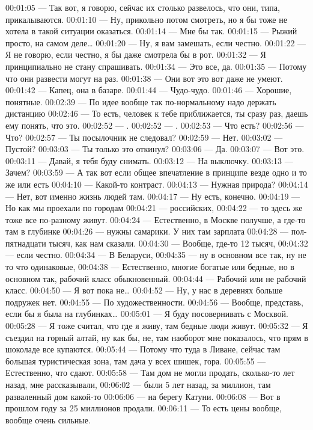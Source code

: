 00:01:05 — Так вот, я говорю, сейчас их столько развелось, что они, типа, прикалываются.
00:01:10 — Ну, прикольно потом смотреть, но я бы тоже не хотела в такой ситуации оказаться.
00:01:14 — Мне бы так.
00:01:15 — Рыжий просто, на самом деле…
00:01:20 — Ну, я вам замешать, если честно.
00:01:22 — Я не говорю, если честно, я бы даже смотрела бы в рот.
00:01:32 — Я принципиально не стану спрашивать.
00:01:34 — Это все, да.
00:01:35 — Потому что они развести могут на раз.
00:01:38 — Они вот это вот даже не умеют.
00:01:42 — Капец, она в базаре.
00:01:44 — Чудо-чудо.
00:01:46 — Хорошие, понятные.
00:02:39 — По идее вообще так по-нормальному надо держать дистанцию
00:02:46 — То есть, человек к тебе приближается, ты сразу раз, даешь ему понять, что это.
00:02:52 — .
00:02:52 — .
00:02:53 — Что есть?
00:02:56 — Что?
00:02:57 — Ты посылочник не следовал?
00:02:59 — Нет.
00:03:02 — Пустой?
00:03:03 — Ты только это откинул?
00:03:06 — Да.
00:03:07 — Вот это.
00:03:11 — Давай, я тебя буду снимать.
00:03:12 — На выключку.
00:03:13 — Зачем?
00:03:59 — А так вот если общее впечатление в принципе везде одно и то же или есть
00:04:10 — Какой-то контраст.
00:04:13 — Нужная природа?
00:04:14 — Нет, вот именно жизнь людей там.
00:04:17 — Ну есть, конечно.
00:04:19 — Но как мы проехали по городам
00:04:21 — российских,
00:04:22 — то здесь же тоже все по-разному живут.
00:04:24 — Естественно, в Москве получше, а где-то там в глубинке
00:04:26 — нужны самарики. У них там зарплата
00:04:28 — пол-пятнадцати тысяч, как нам сказали.
00:04:30 — Вообще, где-то 12 тысяч,
00:04:32 — если честно.
00:04:34 — В Беларуси,
00:04:35 — ну в основном все так, ну не то что одинаковые,
00:04:38 — Естественно, многие богатые или бедные, но в основном так, рабочий класс обыкновенный.
00:04:44 — Рабочий или не рабочий класс.
00:04:50 — Я вот пока не…
00:04:52 — Ну, у нас в деревнях больше подружек нет.
00:04:55 — По художественности.
00:04:56 — Вообще, представь, если бы я была на глубинках…
00:05:01 — Я буду посовернивать с Москвой.
00:05:28 — Я тоже считал, что где я живу, там бедные люди живут.
00:05:32 — Я съездил на горный алтай, ну как бы, не, там наоборот мне показалось, что прям в шоколаде все купаются.
00:05:44 — Потому что туда в Ливане, сейчас там большая туристическая зона, там дача у всех шишек, гора.
00:05:55 — Естественно, что сдают.
00:05:58 — Там дом не могли продать, сколько-то лет назад, мне рассказывали,
00:06:02 — были 5 лет назад, за миллион, там разваленный дом какой-то
00:06:06 — на берегу Катуни.
00:06:08 — Вот в прошлом году за 25 миллионов продали.
00:06:11 — То есть цены вообще, вообще очень сильные.
